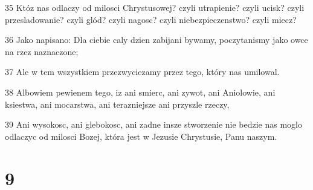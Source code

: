 \par 35 Któz nas odlaczy od milosci Chrystusowej? czyli utrapienie? czyli ucisk? czyli przesladowanie? czyli glód? czyli nagosc? czyli niebezpieczenstwo? czyli miecz?
\par 36 Jako napisano: Dla ciebie caly dzien zabijani bywamy, poczytanismy jako owce na rzez naznaczone;
\par 37 Ale w tem wszystkiem przezwyciezamy przez tego, który nas umilowal.
\par 38 Albowiem pewienem tego, iz ani smierc, ani zywot, ani Aniolowie, ani ksiestwa, ani mocarstwa, ani terazniejsze ani przyszle rzeczy,
\par 39 Ani wysokosc, ani glebokosc, ani zadne insze stworzenie nie bedzie nas moglo odlaczyc od milosci Bozej, która jest w Jezusie Chrystusie, Panu naszym.

\chapter{9}

